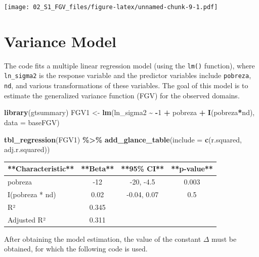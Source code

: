 \documentclass[
  12pt,
]{book}
\newenvironment{Shaded}{\begin{snugshade}}{\end{snugshade}}
\newcommand{\AttributeTok}[1]{\textcolor[rgb]{0.13,0.29,0.53}{#1}}
\newcommand{\DecValTok}[1]{\textcolor[rgb]{0.00,0.00,0.81}{#1}}
\newcommand{\FunctionTok}[1]{\textcolor[rgb]{0.13,0.29,0.53}{\textbf{#1}}}
\newcommand{\NormalTok}[1]{#1}
\newcommand{\OtherTok}[1]{\textcolor[rgb]{0.56,0.35,0.01}{#1}}
\newcommand{\SpecialCharTok}[1]{\textcolor[rgb]{0.81,0.36,0.00}{\textbf{#1}}}
\begin{document}
\texttt{[image: 02\_S1\_FGV\_files/figure-latex/unnamed-chunk-9-1.pdf]}

\hypertarget{variance-model}{%
\section{Variance Model}\label{variance-model}}

The code fits a multiple linear regression model (using the \texttt{lm()} function), where \texttt{ln\_sigma2} is the response variable and the predictor variables include \texttt{pobreza}, \texttt{nd}, and various transformations of these variables. The goal of this model is to estimate the generalized variance function (FGV) for the observed domains.

\begin{Shaded}
\begin{Highlighting}[]
\FunctionTok{library}\NormalTok{(gtsummary)}
\NormalTok{FGV1 }\OtherTok{\textless{}{-}} \FunctionTok{lm}\NormalTok{(ln\_sigma2 }\SpecialCharTok{\textasciitilde{}} \SpecialCharTok{{-}}\DecValTok{1} \SpecialCharTok{+}\NormalTok{  pobreza }\SpecialCharTok{+}
             \FunctionTok{I}\NormalTok{(pobreza}\SpecialCharTok{*}\NormalTok{nd),}
     \AttributeTok{data =}\NormalTok{ baseFGV)}

\FunctionTok{tbl\_regression}\NormalTok{(FGV1) }\SpecialCharTok{\%\textgreater{}\%} 
  \FunctionTok{add\_glance\_table}\NormalTok{(}\AttributeTok{include =} \FunctionTok{c}\NormalTok{(r.squared, adj.r.squared))}
\end{Highlighting}
\end{Shaded}

\begin{tabular}{l|c|c|c}
\hline
**Characteristic** & **Beta** & **95\% CI** & **p-value**\\
\hline
pobreza & -12 & -20, -4.5 & 0.003\\
\hline
I(pobreza * nd) & 0.02 & -0.04, 0.07 & 0.5\\
\hline
R² & 0.345 &  & \\
\hline
Adjusted R² & 0.311 &  & \\
\hline
\end{tabular}

After obtaining the model estimation, the value of the constant \(\Delta\) must be obtained, for which the following code is used.

\begin{Shaded}
\end{Shaded}
\end{document}
